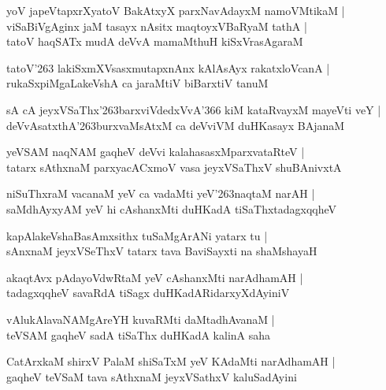 \begin{shloka}
yoV japeVtapxrXyatoV BakAtxyX parxNavAdayxM namoVMtikaM |\\
viSaBiVgAginx jaM tasayx nAsitx maqtoyxVBaRyaM tathA |\\
tatoV haqSATx mudA deVvA mamaMthuH kiSxVrasAgaraM
\end{shloka}

\begin{shloka}
tatoV\char'263 lakiSxmXVsasxmutapxnAnx kAlAsAyx rakatxloVcanA |\\
rukaSxpiMgaLakeVshA ca jaraMtiV biBarxtiV tanuM
\end{shloka}

\begin{shloka}
sA cA jeyxVSaThx\char'263barxviVdedxVvA\char'366 kiM kataRvayxM mayeVti veY |\\
deVvAsatxthA\char'263burxvaMsAtxM ca deVviVM duHKasayx BAjanaM
\end{shloka}

\begin{shloka}
yeVSAM naqNAM gaqheV deVvi kalahasasxMparxvataRteV |\\
tatarx sAthxnaM parxyacACxmoV vasa jeyxVSaThxV shuBAnivxtA 
\end{shloka}

\begin{shloka}
niSuThxraM vacanaM yeV ca vadaMti yeV\char'263naqtaM narAH |\\
saMdhAyxyAM yeV hi cAshanxMti duHKadA tiSaThxtadagxqqheV 
\end{shloka}

\begin{shloka}
kapAlakeVshaBasAmxsithx tuSaMgArANi yatarx tu |\\
sAnxnaM jeyxVSeThxV tatarx tava BaviSayxti na shaMshayaH
\end{shloka}

\begin{shloka}
akaqtAvx pAdayoVdwRtaM yeV cAshanxMti narAdhamAH |\\
tadagxqqheV savaRdA tiSagx duHKadARidarxyXdAyiniV 
\end{shloka}

\begin{shloka}
vAlukAlavaNAMgAreYH kuvaRMti daMtadhAvanaM |\\
teVSAM gaqheV sadA tiSaThx duHKadA kalinA saha
\end{shloka}

\begin{shloka}
CatArxkaM shirxV PalaM shiSaTxM yeV KAdaMti narAdhamAH |\\
gaqheV teVSaM tava sAthxnaM jeyxVSathxV kaluSadAyini
\end{shloka}


